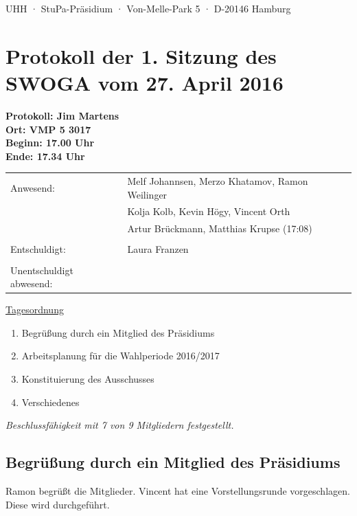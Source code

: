 \documentclass[ngerman,headheight=70pt]{scrartcl}
\begin{document}
    UHH · StuPa-Präsidium · Von-Melle-Park 5 · D-20146 Hamburg

    \section*{Protokoll der 1. Sitzung des SWOGA vom 27. April 2016}

    \textbf{Protokoll: Jim Martens}\\
    \textbf{Ort: VMP 5 3017}\\
    \textbf{Beginn: 17.00 Uhr}\\
    \textbf{Ende: 17.34 Uhr}

    \vspace{0.5cm}
    \begin{tabular}{ll}
        Anwesend: & Melf Johannsen, Merzo Khatamov, Ramon Weilinger \\
                  & Kolja Kolb, Kevin Högy, Vincent Orth\\
                  & Artur Brückmann, Matthias Krupse (17:08) \\
                  & \\
        Entschuldigt: & Laura Franzen \\
                      &\\
        Unentschuldigt abwesend: &  \\
    \end{tabular}

    \underline{Tagesordnung}
    \begin{enumerate}[label={\textbf{Top \theenumi}},leftmargin=*]
        \item Begrüßung durch ein Mitglied des Präsidiums
        \item Arbeitsplanung für die Wahlperiode 2016/2017
        \item Konstituierung des Ausschusses
        \item Verschiedenes
    \end{enumerate}

    \textit{Beschlussfähigkeit mit 7 von 9 Mitgliedern festgestellt.}

    \subsection{Begrüßung durch ein Mitglied des Präsidiums}

    Ramon begrüßt die Mitglieder. Vincent hat eine Vorstellungsrunde
    vorgeschlagen. Diese wird durchgeführt.
\end{document}
